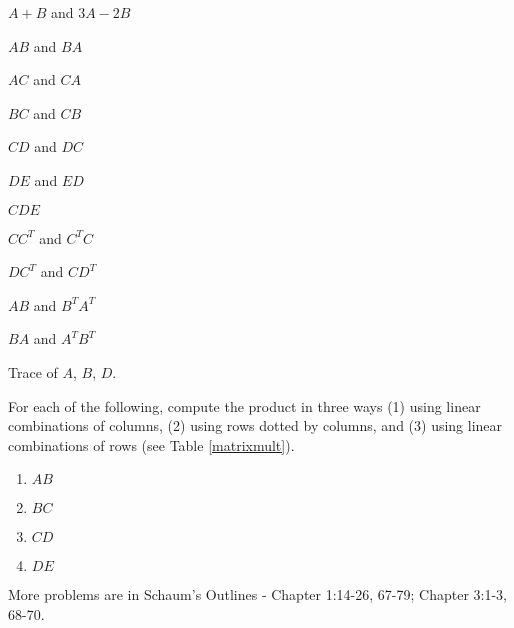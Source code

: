 \begin{enumerate}
\begin{enumerate}
\begin{multicols}{4}
	\item $A+B$ and $3A-2B$
	\item $AB$ and $BA$
	\item $AC$ and $CA$
	\item $BC$ and $CB$
	\item $CD$ and $DC$
	\item $DE$ and $ED$
	\item $CDE$
	\item $CC^T$ and $C^TC$
	\item $DC^T$ and $CD^T$
	\item $AB$ and $B^TA^T$
	\item $BA$ and $A^TB^T$
	\item Trace of $A$, $B$, $D$.	
\end{multicols}
\end{enumerate}
For each of the following, compute the product in three ways (1) using linear combinations of columns, (2) using rows dotted by columns, and (3) using linear combinations of rows (see Table \ref{matrixmult}).
\begin{multicols}{4}
\begin{enumerate}[resume]
\item $AB$
\item $BC$
\item $CD$
\item $DE$
\end{enumerate}
\end{multicols}
More problems are in Schaum's Outlines - 
Chapter 1:14-26, 67-79;
Chapter 3:1-3, 68-70.







\end{enumerate}
